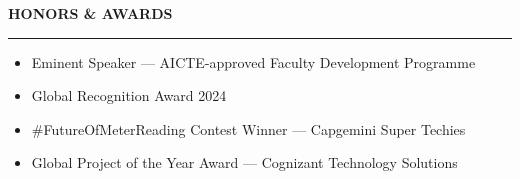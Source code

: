 \documentclass[11pt]{article}
\newcommand{\sect}[1]{%
  \vspace{10pt}%
  {\color{sectioncolor}\large\bfseries\MakeUppercase{#1}}\\[-6pt]%
  {\color{rulecolor}\rule{\textwidth}{1.2pt}}%
  \vspace{4pt}%
}
\begin{document}
\sect{Honors \& Awards}

\begin{itemize}
\setlength{\itemsep}{1pt}\setlength{\parsep}{0pt}\setlength{\topsep}{3pt}
    \item Eminent Speaker --- AICTE-approved Faculty Development Programme
    \item Global Recognition Award 2024
    \item \#FutureOfMeterReading Contest Winner --- Capgemini Super Techies
    \item Global Project of the Year Award --- Cognizant Technology Solutions
\end{itemize}
\end{document}
